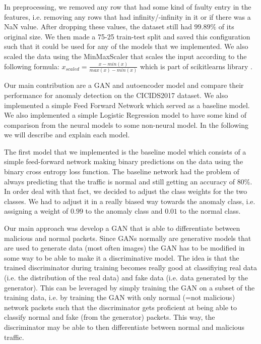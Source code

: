\documentclass[]{article}
\begin{document}
	 \noindent
	 In preprocessing, we removed any row that had some kind of faulty entry in the features, i.e. removing any rows that had infinity/-infinity in it or if there was a NaN value. After dropping these values, the dataset still had $99.89\%$ of its original size. We then made a 75-25 train-test split and saved this configuration such that it could be used for any of the models that we implemented. We also scaled the data using the MinMaxScaler that scales the input according to the following formula: $x_{scaled} = \frac{x-min(x)}{max(x)-min(x)}$ which is part of scikitlearns library \cite{sklearn_api}.
	 \newline
	 
	 \noindent
	 Our main contribution are a GAN and autoencoder model and compare their performance for anomaly detection on the CICIDS2017 dataset. We also implemented  a simple Feed Forward Network which served as a baseline model. We also implemented a simple Logistic Regression model to have some kind of comparison from the neural models to some non-neural model. In the following we will describe and explain each model.
	 \newline
	 
	 \noindent
	 The first model that we implemented is the baseline model which consists of a simple feed-forward network making binary predictions on the data using the binary cross entropy loss function. The baseline network had the problem of always predicting that the traffic is normal and still getting an accuracy of $80\%$. In order deal with that fact, we decided to adjust the class weights for the two classes. We had to adjust it in a really biased way towards the anomaly class, i.e. assigning a weight of $0.99$ to the anomaly class and $0.01$ to the normal class. 
	 \newline
	 
	 
	 \noindent
	 Our main approach was develop a GAN that is able to differentiate between malicious and normal packets. Since GANs normally are generative models that are used to generate data (most often images) the GAN has to be modified in some way to be able to make it a discriminative model.  The idea is that the trained discriminator during training becomes really good at classifiying real data (i.e. the distribution of the real data) and fake data (i.e. data generated by the generator). This can be leveraged by simply training the GAN on a subset of the training data, i.e. by training the GAN with only normal (=not malicious) network packets such that the discriminator gets proficient at being able to classify normal and fake (from the generator) packets. This way, the discriminator may be able to then differentiate between normal and malicious traffic. 
	 
\end{document}
